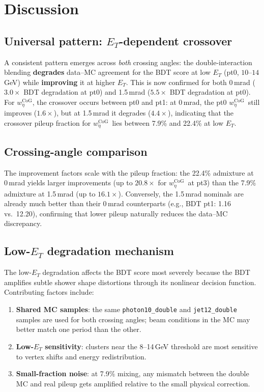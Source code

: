 \documentclass[11pt,a4paper]{article}
\newcommand{\wetacog}{\texorpdfstring{$w_{\eta}^{\mathrm{CoG}}$}{w\_eta\textasciicircum CoG}}
\begin{document}
\section{Discussion}
\label{sec:discussion}

\subsection{Universal pattern: $E_T$-dependent crossover}

A consistent pattern emerges across \emph{both} crossing angles: the
double-interaction blending \textbf{degrades} data--MC agreement for the BDT
score at low $E_T$ (pt0, $10$--$14$\,GeV) while \textbf{improving} it at
higher $E_T$.  This is now confirmed for both 0\,mrad ($3.0\times$ BDT
degradation at pt0) and 1.5\,mrad ($5.5\times$ BDT degradation at pt0).
For \wetacog, the crossover occurs between pt0 and pt1: at 0\,mrad, the
pt0 \wetacog\ still improves ($1.6\times$), but at 1.5\,mrad it degrades
($4.4\times$), indicating that the crossover pileup fraction for \wetacog\
lies between 7.9\% and 22.4\% at low $E_T$.

\subsection{Crossing-angle comparison}

The improvement factors scale with the pileup fraction: the 22.4\%
admixture at 0\,mrad yields larger improvements (up to $20.8\times$ for
\wetacog\ at pt3) than the 7.9\% admixture at 1.5\,mrad (up to
$16.1\times$).  Conversely, the 1.5\,mrad nominals are already much better
than their 0\,mrad counterparts (e.g., BDT pt1: 1.16 vs.\ 12.20),
confirming that lower pileup naturally reduces the data--MC discrepancy.

\subsection{Low-$E_T$ degradation mechanism}

The low-$E_T$ degradation affects the BDT score most severely because the
BDT amplifies subtle shower shape distortions through its nonlinear decision
function.  Contributing factors include:
\begin{enumerate}
\item \textbf{Shared MC samples}: the same \texttt{photon10\_double} and
  \texttt{jet12\_double} samples are used for both crossing angles; beam
  conditions in the MC may better match one period than the other.
\item \textbf{Low-$E_T$ sensitivity}: clusters near the 8--14\,GeV
  threshold are most sensitive to vertex shifts and energy redistribution.
\item \textbf{Small-fraction noise}: at 7.9\% mixing, any mismatch
  between the double MC and real pileup gets amplified relative to the
  small physical correction.
\end{enumerate}
\end{document}
